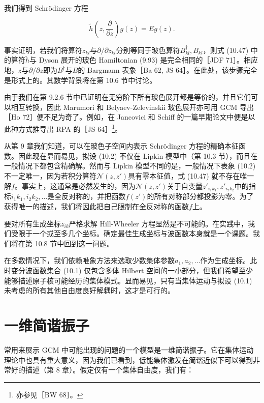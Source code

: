 我们得到 Schrödinger 方程

\begin{equation}
\tilde{h}\left(z,\frac{\partial}{\partial z}\right)g(z)=Eg(z).\label{eq:gcm_schrodinger_dyson}
\end{equation}

事实证明，若我们将算符$z_{kl}$与$\partial/\partial z_{kl}$分别等同于玻色算符$B^{\dagger}_{kl},B_{kl}$，则式
(10.47) 中的算符$\tilde{h}$与 Dyson 展开的玻色 Hamiltonian (9.93) 是完全相同的［JDF
71］。相应地，$z$与$\partial/\partial z$即为$B^{\dagger}$与$B$的 Bargmann
表象［Ba 62, JS 64］。在此处，该步骤完全是形式上的。其数学背景将在第 10.6 节中讨论。

由于我们在第 9.2.6 节中已证明在无穷阶下所有玻色展开都是等价的，并且它们可以相互转换，因此 Marumori 和 Belyaev-Zelevinskii
玻色展开亦可用 GCM 导出［Ho 72］便不足为奇了。例如，在 Jancovici 和 Schiff 的一篇早期论文中便是以此种方式推导出
RPA 的［JS 64］\footnote{亦参见［BW 68］。}。

从第 9 章我们知道，可以在玻色子空间内表示 Schrödinger 方程的精确本征函数。因此现在显而易见，拟设 (10.2) 不仅在
Lipkin 模型中（第 10.3 节），而且在一般情况下都包含精确解。然而与 Lipkin 模型不同的是，一般情况下表象 (10.2)
不一定唯一，因为若积分算符$\mathscr{N}(z,z')$具有零本征值，式 (10.47) 就不存在唯一解$f$。事实上，这通常是必然发生的，因为$\mathscr{N}(z,z')$关于自变量$z'_{i_{1}k_{1}},z'_{i_{2}k_{2}}$中的指标$i_{1}k_{1},i_{2}k_{2},\dots$是全反对称的，并把函数$f(z')$的所有对称部分都投影为零。为了获得唯一的描述，我们将因此把自己限制在全反对称的函数$f$上。

要对所有生成坐标$z_{ik}$严格求解 Hill-Wheeler 方程显然是不可能的。在实践中，我们受限于一个或至多几个坐标。确定最佳生成坐标与波函数本身就是一个课题。我们将在第
10.8 节中回到这一问题。

在多数情况下，我们依赖唯象方法来选取少数集体参数$a_{1},a_{2},\dots$作为生成坐标。此时变分波函数集合 (10.1)
仅包含多体 Hilbert 空间的一小部分，但我们希望至少能够描述原子核可能经历的集体模式。显而易见，只有当集体运动与拟设 (10.1)
未考虑的所有其他自由度良好解耦时，这才是可行的。

\section{一维简谐振子}

常用来展示 GCM 中可能出现的问题的一个模型是一维简谐振子。它在集体运动理论中也具有重大意义，因为我们已看到，低能集体激发在简谐近似下可以得到非常好的描述（第
8 章）。假定仅有一个集体自由度，我们有：


